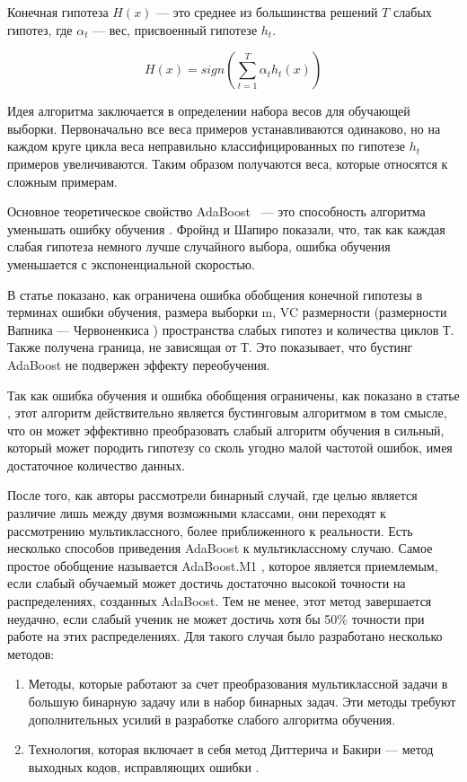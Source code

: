 Конечная гипотеза $H(x)$ ---  это среднее из большинства решений $T$ слабых гипотез, где $\alpha_t$ --- вес, присвоенный гипотезе $h_t$.

$$
H(x)=sign(\sum_{t=1}^T\alpha_t h_t(x))
$$

Идея алгоритма заключается в определении набора весов для обучающей выборки. Первоначально все веса примеров устанавливаются одинаково, но на каждом круге цикла веса неправильно классифицированных по гипотезе $h_t$ примеров увеличиваются. Таким образом получаются веса, которые относятся к сложным примерам.

Основное теоретическое свойство AdaBoost~ --- это способность алгоритма уменьшать ошибку обучения \cite{Freund 1999}. Фройнд и Шапиро показали, что, так как каждая слабая гипотеза немного лучше случайного выбора, ошибка обучения уменьшается с экспоненциальной скоростью.

В статье \cite{Freund 1999} показано, как ограничена ошибка обобщения конечной гипотезы в терминах ошибки обучения, размера выборки m, VC размерности (размерности Вапника --- Червоненкиса \cite{Schapire 1997}) пространства слабых гипотез и количества циклов Т. Также получена граница, не зависящая от Т. Это показывает, что бустинг AdaBoost не подвержен эффекту переобучения.

Так как ошибка обучения и ошибка обобщения ограничены, как показано в статье \cite{Freund 1999}, этот алгоритм действительно является бустинговым алгоритмом в том смысле, что он может эффективно преобразовать слабый алгоритм обучения в сильный, который может породить гипотезу со сколь угодно малой частотой ошибок, имея достаточное количество данных.

После того, как авторы рассмотрели бинарный случай, где целью является различие лишь между двумя возможными классами, они переходят к рассмотрению мультиклассного, более приближенного к реальности. Есть несколько способов приведения AdaBoost к мультиклассному случаю. Самое простое обобщение называется AdaBoost.M1 \cite{Freund 1997}, которое является приемлемым, если слабый обучаемый может достичь достаточно высокой точности на распределениях, созданных AdaBoost. Тем не менее, этот метод завершается неудачно, если слабый ученик не может достичь хотя бы 50\% точности при работе на этих  распределениях. Для такого случая было разработано несколько методов:

\begin{enumerate}
\item Методы, которые работают за счет преобразования мультиклассной задачи в большую бинарную задачу или в набор бинарных задач. Эти методы требуют дополнительных усилий в разработке слабого алгоритма обучения.
\item Технология, которая включает в себя метод Диттерича и Бакири --- метод выходных кодов, исправляющих ошибки \cite{Schapire 1997}.
\end{enumerate}

